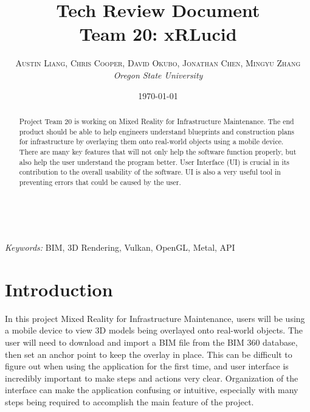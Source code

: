 \documentclass[a4paper, 11pt]{article} %
\title{\textbf{Tech Review Document}\\ %
Team 20: xRLucid} %
\author{\textsc{Austin Liang, Chris Cooper, David Okubo, Jonathan Chen, Mingyu Zhang} %
\\{\textit{Oregon State University}}} %
\date{\today} %
\makeatletter
\renewcommand{\maketitle}{ %
\begin{flushright} %
{\LARGE\@title} %

\vspace{50pt} %

{\large\@author} %
\\\@date %

\vspace{40pt} %
\end{flushright}
}
\makeatother
\begin{document}
\maketitle %



\begin{abstract}
Project Team 20 is working on Mixed Reality for Infrastructure Maintenance. The end product should be able to help engineers understand blueprints and construction plans for infrastructure by overlaying them onto real-world objects using a mobile device. There are many key features that will not only help the software function properly, but also help the user understand the program better. User Interface (UI) is crucial in its contribution to the overall usability of the software. UI is also a very useful tool in preventing errors that could be caused by the user.
\end{abstract}

\hspace*{3,6mm}\textit{Keywords:} BIM, 3D Rendering, Vulkan, OpenGL, Metal, API %

\vspace{30pt} %

\newpage
\section{Introduction}
In this project Mixed Reality for Infrastructure Maintenance, users will be using a mobile device to view 3D models being overlayed onto real-world objects. The user will need to download and import a BIM file from the BIM 360 database, then set an anchor point to keep the overlay in place. This can be difficult to figure out when using the application for the first time, and user interface is incredibly important to make steps and actions very clear. Organization of the interface can make the application confusing or intuitive, especially with many steps being required to accomplish the main feature of the project.
\end{document}
